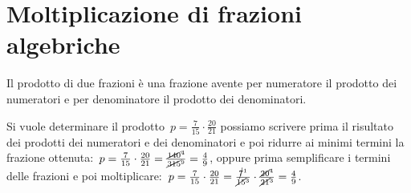 

\section{Moltiplicazione di frazioni algebriche}
\label{sec:frazalg_moltiplicazione}

Il prodotto di due frazioni è una frazione avente per numeratore il prodotto 
dei numeratori e per denominatore il prodotto dei denominatori.

Si vuole determinare il prodotto~$p=\frac{7}{15}\cdot \frac{20}{21}$ possiamo 
scrivere prima il risultato dei prodotti dei numeratori e dei denominatori e 
poi ridurre ai minimi termini la frazione
ottenuta:~$p=\frac{7}{15}\cdot \frac{20}{21}=
\frac{\cancel{140}^4}{\cancel{315}^9}=\frac{4}{9}$,
oppure prima semplificare i termini delle frazioni e poi
moltiplicare:~$p=\frac{7}{15}\cdot \frac{20}{21}=
\frac{\cancel{7}^1}{\cancel{15}^3}\cdot \frac{\cancel{20}^4}{\cancel{21}^3}=
\frac{4}{9}$.

